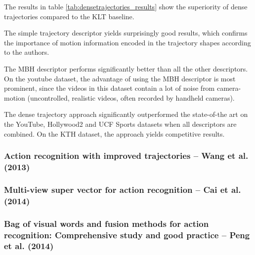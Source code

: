 The results in table \ref{tab:densetrajectories_results} show the superiority of dense trajectories compared to the KLT baseline.

The simple trajectory descriptor yields surprisingly good results, which confirms the importance of motion information encoded in the trajectory shapes according to the authors.

The MBH descriptor performs significantly better than all the other descriptors.
On the youtube dataset, the advantage of using the MBH descriptor is most prominent, since the videos in this dataset contain a lot of noise from camera-motion (uncontrolled, realistic videos, often recorded by handheld cameras).

The dense trajectory approach significantly outperformed the state-of-the art on the YouTube, Hollywood2 and UCF Sports datasets when all descriptors are combined.
On the KTH dataset, the approach yields competitive results.

\subsubsection{Action recognition with improved trajectories -- Wang et al. (2013)}
\cite{wang_action_2013}

\subsubsection{Multi-view super vector for action recognition -- Cai et al. (2014)}
\cite{cai_multi-view_2014}

\subsubsection{Bag of visual words and fusion methods for action recognition: Comprehensive study and good practice -- Peng et al. (2014)}
\cite{peng_bag_2014}

